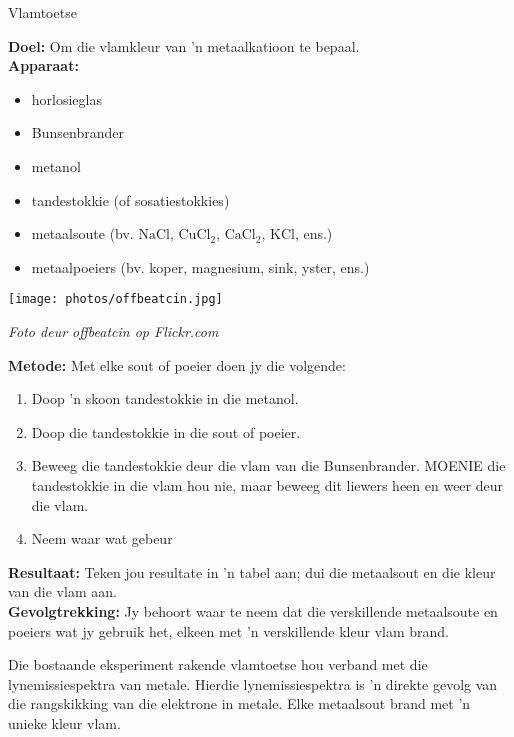\nopagebreak
\begin{i_experiment}{Vlamtoetse}{
\nopagebreak
\textbf{Doel:}\newline
Om die vlamkleur van 'n metaalkatioon te bepaal.\\
\textbf{Apparaat:}\newline
\begin{minipage}{.5\textwidth}
\begin{itemize}[noitemsep]
\item horlosieglas
\item Bunsenbrander
\item metanol
\item tandestokkie (of sosatiestokkies)
\item metaalsoute (bv. $\text{NaCl}$, ${\text{CuCl}}_{2}$, ${\text{CaCl}}_{2}$, $\text{KCl}$, ens.)
\item metaalpoeiers (bv. koper, magnesium, sink, yster, ens.)
\end{itemize}
\end{minipage}
\begin{minipage}{.5\textwidth}
\begin{center}
 \texttt{[image: photos/offbeatcin.jpg]}\par
\textit{Foto deur offbeatcin op Flickr.com}
\end{center}
\end{minipage}
\textbf{Metode:}\newline
Met elke sout of poeier doen jy die volgende: 
\begin{enumerate}[noitemsep, label=\textbf{\arabic*}. ] 
\item Doop 'n skoon tandestokkie in die metanol.
\item Doop die tandestokkie in die sout of poeier.
\item Beweeg die tandestokkie deur die vlam van die Bunsenbrander. MOENIE die tandestokkie in die vlam hou nie,
maar beweeg dit liewers heen en weer deur die vlam.
\item Neem waar wat gebeur
\end{enumerate}
\textbf{Resultaat:}\newline
Teken jou resultate in 'n tabel aan; dui die metaalsout en die kleur van die vlam aan.
\\ 
\textbf{Gevolgtrekking:}\newline
Jy behoort waar te neem dat die verskillende metaalsoute en poeiers wat jy gebruik het, elkeen met 'n verskillende kleur vlam brand.}
\end{i_experiment}
Die bostaande eksperiment rakende vlamtoetse hou verband met die lynemissiespektra van metale. Hierdie lynemissiespektra is 'n direkte gevolg van die rangskikking van die elektrone in metale. Elke metaalsout brand met 'n unieke kleur vlam. \par 

